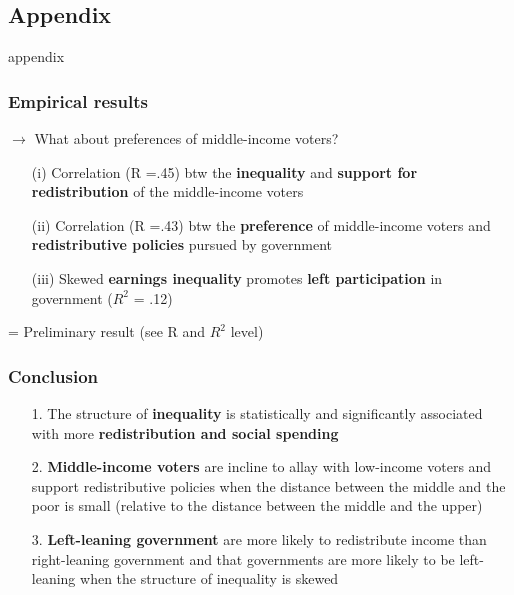 \documentclass{beamer}
\begin{document}
\begin{frame}
\begin{itemize}
\begin{frame}
\subsection{Appendix}
appendix
\end{frame}

\begin{frame}
\frametitle{Empirical results}
$\longrightarrow$  What about preferences of middle-income voters?
\medskip
\begin{itemize}
\item[(i)] Correlation (R =.45) btw the \textbf{inequality} and \textbf{support for redistribution} of the middle-income voters  
\item[(ii)] Correlation (R =.43)  btw the \textbf{preference} of middle-income voters and \textbf{redistributive policies} pursued by government
\item[(iii)] Skewed \textbf{earnings inequality} promotes \textbf{left participation} in government ($R^{2}$ = .12)
\end{itemize}
\medskip
\begin{center}
= Preliminary result (see R and $R^{2}$ level)\\
\end{center}
\end{frame}
\begin{frame}
\frametitle{Conclusion}
\begin{itemize}
\item[1.] The structure of \textbf{inequality} is statistically and significantly associated with more \textbf{redistribution and social spending}
\medskip
\medskip
\medskip
\item[2.] \textbf{Middle-income voters} are incline to allay with low-income voters and support redistributive policies when the distance between the middle and the poor is small (relative to the distance between the middle and the upper)
\medskip
\medskip
\medskip
\item[3.] \textbf{Left-leaning government} are more likely to redistribute income than right-leaning government and that governments are more likely to be left-leaning when the structure of inequality is skewed
\end{itemize}
\end{frame}


\end{itemize}
\end{frame}
\end{document}
